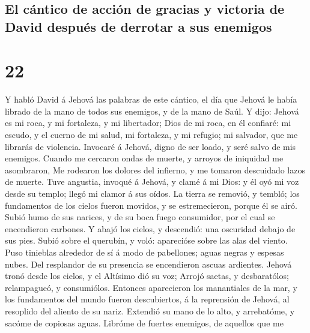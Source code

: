\hypertarget{el-cuxe1ntico-de-acciuxf3n-de-gracias-y-victoria-de-david-despuuxe9s-de-derrotar-a-sus-enemigos}{%
\subsection{El cántico de acción de gracias y victoria de David después
de derrotar a sus
enemigos}\label{el-cuxe1ntico-de-acciuxf3n-de-gracias-y-victoria-de-david-despuuxe9s-de-derrotar-a-sus-enemigos}}

\hypertarget{section-21}{%
\section{22}\label{section-21}}

 Y habló David á Jehová las palabras de este cántico, el
día que Jehová le había librado de la mano de todos sus enemigos, y de
la mano de Saúl.  Y dijo: Jehová es mi roca, y mi
fortaleza, y mi libertador;  Dios de mi roca, en él
confiaré: mi escudo, y el cuerno de mi salud, mi fortaleza, y mi
refugio; mi salvador, que me librarás de violencia. 
Invocaré á Jehová, digno de ser loado, y seré salvo de mis enemigos.
 Cuando me cercaron ondas de muerte, y arroyos de
iniquidad me asombraron,  Me rodearon los dolores del
infierno, y me tomaron descuidado lazos de muerte.  Tuve
angustia, invoqué á Jehová, y clamé á mi Dios: y él oyó mi voz desde su
templo; llegó mi clamor á sus oídos.  La tierra se
removió, y tembló; los fundamentos de los cielos fueron movidos, y se
estremecieron, porque él se airó.  Subió humo de sus
narices, y de su boca fuego consumidor, por el cual se encendieron
carbones.  Y abajó los cielos, y descendió: una oscuridad
debajo de sus pies.  Subió sobre el querubín, y voló:
aparecióse sobre las alas del viento.  Puso tinieblas
alrededor de sí á modo de pabellones; aguas negras y espesas nubes.
 Del resplandor de su presencia se encendieron ascuas
ardientes.  Jehová tronó desde los cielos, y el Altísimo
dió su voz;  Arrojó saetas, y desbaratólos; relampagueó,
y consumiólos.  Entonces aparecieron los manantiales de
la mar, y los fundamentos del mundo fueron descubiertos, á la reprensión
de Jehová, al resoplido del aliento de su nariz. 
Extendió su mano de lo alto, y arrebatóme, y sacóme de copiosas aguas.
 Libróme de fuertes enemigos, de aquellos que me
